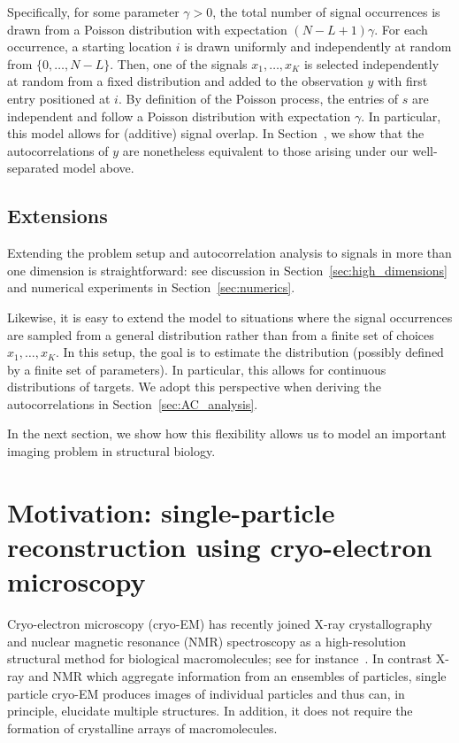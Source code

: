 \documentclass[12pt]{article}
\newcommand{\1}{\mathbf{1}}
\newcommand{\TODO}[1]{{\color{red}{[#1]}}}
\theoremstyle{plain}
\theoremstyle{definition}
\theoremstyle{remark}
\theoremstyle{plain}
\theoremstyle{remark}
\theoremstyle{plain}
\theoremstyle{plain}
\theoremstyle{plain}
\numberwithin{equation}{section}
\begin{document}
\TODO{Careful that $\gamma$ changed by a factor of $L$: need to modify here too.} Specifically, for some parameter $\gamma > 0$, the total number of signal occurrences is drawn from a Poisson distribution with expectation $(N-L+1)\gamma$. For each occurrence, a starting location $i$ is drawn uniformly and independently at random from $\{0, \ldots, N-L\}$. Then, one of the signals $x_1, \ldots, x_K$ is selected independently at random from a fixed distribution and added to the observation $y$ with first entry positioned at $i$. 
By definition of the Poisson process, the entries of $s$ are independent and follow a Poisson distribution with expectation $\gamma$. In particular, this model allows for (additive) signal overlap. In Section~\TODO{ref?}, we show that the autocorrelations of $y$ are nonetheless equivalent to those arising under our well-separated model above.
 
\subsection*{Extensions} \label{sec:extensions}

Extending the problem setup and autocorrelation analysis to signals in more than one dimension is straightforward: see discussion in Section~\ref{sec:high_dimensions} and numerical experiments in Section~\ref{sec:numerics}.

Likewise, it is easy to extend the model to situations where the signal occurrences are sampled from a general distribution rather than from a finite set of choices $x_1, \ldots, x_K$. In this setup, the goal is to estimate the distribution (possibly defined by a finite set of parameters). In particular, this allows for continuous distributions of targets. We adopt this perspective when deriving the autocorrelations in Section~\ref{sec:AC_analysis}.

In the next section, we show how this flexibility allows us to model an important imaging problem in structural biology.



\section{Motivation: single-particle reconstruction using cryo-electron microscopy}
Cryo-electron microscopy (cryo-EM)  has recently joined X-ray crystallography and nuclear magnetic resonance (NMR) spectroscopy as a high-resolution structural method for biological macromolecules; see for instance~\cite{frank2006three,kuhlbrandt2014resolution,bartesaghi20152}. 
In contrast X-ray and NMR which aggregate information from an ensembles of
particles, single particle cryo-EM produces images of individual particles and thus can, in principle, elucidate multiple  structures.
In addition, it does not require the formation of crystalline arrays of macromolecules.
\end{document}
